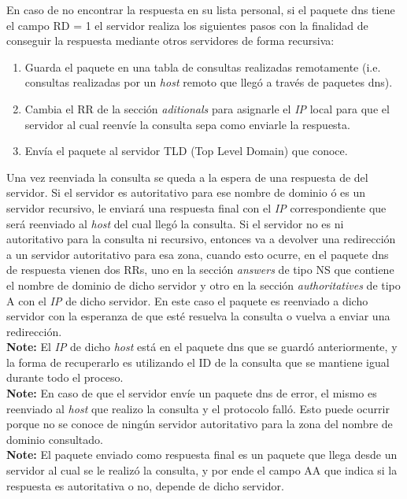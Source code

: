 \documentclass[10pt,a4paper]{article}
\begin{document}
En caso de no encontrar la respuesta en su lista personal, si el paquete dns tiene el campo RD = 1 el servidor realiza los siguientes pasos con la finalidad de conseguir la respuesta mediante otros servidores de forma recursiva:

\begin{enumerate}
\item Guarda el paquete en una tabla de consultas realizadas remotamente (i.e. consultas realizadas por un \textit{host} remoto que llegó a través de paquetes dns).
\item Cambia el RR de la sección \textit{aditionals} para asignarle el \textit{IP} local para que el servidor al cual reenvíe la consulta sepa como enviarle la respuesta.
\item Envía el paquete al servidor TLD (Top Level Domain) que conoce.
\end{enumerate}

Una vez reenviada la consulta se queda a la espera de una respuesta de del servidor. Si el servidor es autoritativo para ese nombre de dominio ó es un servidor recursivo, le enviará una respuesta final con el \textit{IP} correspondiente que será reenviado al \textit{host} del cual llegó la consulta. Si el servidor no es ni autoritativo para la consulta ni recursivo, entonces va a devolver una redirección a un servidor autoritativo para esa zona, cuando esto ocurre, en el paquete dns de respuesta vienen dos RRs, uno en la sección \textit{answers} de tipo NS que contiene el nombre de dominio de dicho servidor y otro en la sección \textit{authoritatives} de tipo A con el \textit{IP} de dicho servidor. En este caso el paquete es reenviado a dicho servidor con la esperanza de que esté resuelva la consulta o vuelva a enviar una redirección. \\

\textbf{Note:} El \textit{IP} de dicho \textit{host} está en el paquete dns que se guardó anteriormente, y la forma de recuperarlo es utilizando el ID de la consulta que se mantiene igual durante todo el proceso. \\

\textbf{Note:} En caso de que el servidor envíe un paquete dns de error, el mismo es reenviado al \textit{host} que realizo la consulta y el protocolo falló. Esto puede ocurrir porque no se conoce de ningún servidor autoritativo para la zona del nombre de dominio consultado. \\

\textbf{Note:} El paquete enviado como respuesta final es un paquete que llega desde un servidor al cual se le realizó la consulta, y por ende el campo AA que indica si la respuesta es autoritativa o no, depende de dicho servidor. \\
\end{document}
